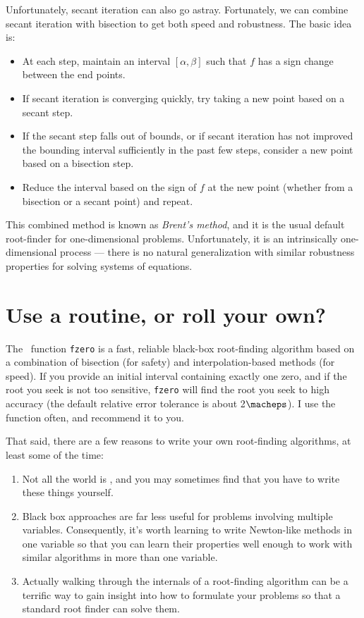 \documentclass[12pt, leqno]{article} %
\begin{document}
Unfortunately, secant iteration can also go astray.  Fortunately, we
can combine secant iteration with bisection to get both speed and
robustness.  The basic idea is:
\begin{itemize}
\item
  At each step, maintain an interval $[\alpha,\beta]$ such that $f$
  has a sign change between the end points.
\item
  If secant iteration is converging quickly, try taking a new point
  based on a secant step.
\item
  If the secant step falls out of bounds, or if secant iteration has
  not improved the bounding interval sufficiently in the past few
  steps, consider a new point based on a bisection step.
\item
  Reduce the interval based on the sign of $f$ at the new point
  (whether from a bisection or a secant point) and repeat.
\end{itemize}
This combined method is known as {\em Brent's method}, and it is the
usual default root-finder for one-dimensional problems.
Unfortunately, it is an intrinsically one-dimensional process ---
there is no natural generalization with similar robustness properties
for solving systems of equations.

\section*{Use a routine, or roll your own?}


The \matlab\ function {\tt fzero} is a fast, reliable black-box root-finding
algorithm based on a combination of bisection (for safety) and
interpolation-based methods (for speed).  If you provide an initial
interval containing exactly one zero, and if the root you seek is not
too sensitive, {\tt fzero} will find the root you seek to high accuracy
(the default relative error tolerance is about 2$\macheps$).  I use
the function often, and recommend it to you.

That said, there are a few reasons to write your own root-finding
algorithms, at least some of the time:
\begin{enumerate}
\item
  Not all the world is \matlab, and you may sometimes find that you
  have to write these things yourself.
\item
  Black box approaches are far less useful for problems involving
  multiple variables.  Consequently, it's worth learning to write
  Newton-like methods in one variable so that you can learn their
  properties well enough to work with similar algorithms in more than
  one variable.
\item
  Actually walking through the internals of a root-finding algorithm
  can be a terrific way to gain insight into how to formulate your
  problems so that a standard root finder can solve them.
\end{enumerate}
\end{document}

